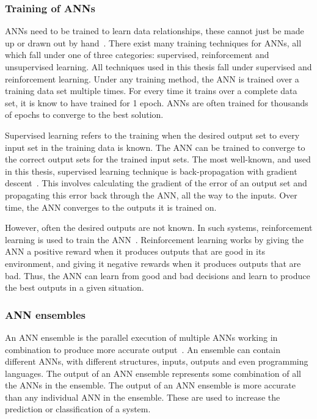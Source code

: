 \subsubsection{Training of \acfp{ANN}}
\acp{ANN} need to be trained to learn data relationships, these cannot just be made up or drawn out by hand~\cite{ann-train}.
There exist many training techniques for \acp{ANN}, all which fall under one of three categories: supervised, reinforcement and unsupervised learning.
All techniques used in this thesis fall under supervised and reinforcement learning.
Under any training method, the \ac{ANN} is trained over a training data set multiple times. 
For every time it trains over a complete data set, it is know to have trained for 1 epoch.
\acp{ANN} are often trained for thousands of epochs to converge to the best solution.

Supervised learning refers to the training when the desired output set to every input set in the training data is known.
The \ac{ANN} can be trained to converge to the correct output sets for the trained input sets.
The most well-known, and used in this thesis, supervised learning technique is back-propagation with gradient descent~\cite{grad-desc}.
This involves calculating the gradient of the error of an output set and propagating this error back through the \ac{ANN}, all the way to the inputs.
Over time, the \ac{ANN} converges to the outputs it is trained on.

However, often the desired outputs are not known.
In such systems, reinforcement learning is used to train the \ac{ANN}~\cite{reinforcement-learning}.
Reinforcement learning works by giving the \ac{ANN} a positive reward when it produces outputs that are good in its environment, and giving it negative rewards when it produces outputs that are bad. 
Thus, the \ac{ANN} can learn from good and bad decisions and learn to produce the best outputs in a given situation.

\subsubsection{\acf{ANN} ensembles}
An \ac{ANN} ensemble is the parallel execution of multiple \acp{ANN} working in combination to produce more accurate output~\cite{Maqsood2004}.
An ensemble can contain different \acp{ANN}, with different structures, inputs, outputs and even programming languages.
The output of an \ac{ANN} ensemble represents some combination of all the \acp{ANN} in the ensemble.
The output of an \ac{ANN} ensemble is more accurate than any individual \ac{ANN} in the ensemble.
These are used to increase the prediction or classification of a system.

